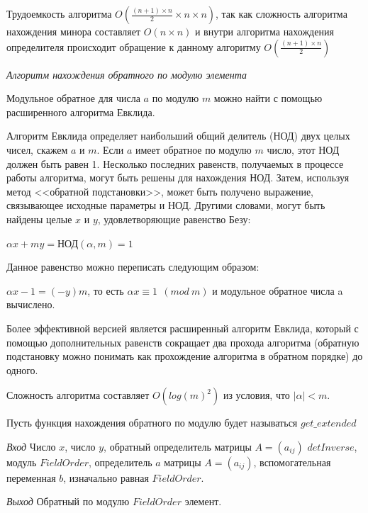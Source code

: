\documentclass[bachelor, och, labwork]{shiza}
\begin{document}
Трудоемкость алгоритма $O(\frac{(n + 1)\times n }{2} \times n \times n)$, так как сложность алгоритма нахождения 
минора составляет $O(n \times n)$ и внутри алгоритма нахождения определителя происходит
обращение к данному алгоритму $O(\frac{(n + 1)\times n}{2})$

\begin{center}
    \textit{Алгоритм нахождения обратного по модулю элемента}
\end{center}


Модульное обратное для числа $a$ по модулю $m$ можно найти с помощью расширенного 
алгоритма Евклида.

Алгоритм Евклида определяет наибольший общий делитель (НОД) двух целых чисел, скажем $a$ и $m$. 
Если $a$ имеет обратное по модулю $m$ число, этот НОД должен быть равен 1. Несколько 
последних равенств, получаемых в процессе работы алгоритма, могут быть решены для 
нахождения НОД. Затем, используя метод <<обратной подстановки>>, может быть получено 
выражение, связывающее исходные параметры и НОД. Другими словами, могут быть 
найдены целые $x$ и $y$, удовлетворяющие равенство Безу:
\begin{center}
    $\alpha x + my = \text{НОД}(\alpha, m) = 1$
\end{center}

Данное равенство можно переписать следующим образом:

\begin{center}
    $\alpha x - 1= (-y)m$, то есть $\alpha x \equiv 1 ~~(mod ~m )$ и модульное обратное числа a вычислено.
\end{center}

Более эффективной версией является расширенный алгоритм Евклида, который с помощью 
дополнительных равенств сокращает два прохода алгоритма (обратную подстановку можно 
понимать как прохождение алгоритма в обратном порядке) до одного.

Сложность алгоритма составляет $O(log(m)^2)$ из условия, что $| \alpha \vert < m$.

Пусть функция нахождения обратного по модулю будет называться $get\_extended$

\textit{Вход} Число $x$, число $y$, обратный определитель матрицы $A = (a_{ij})$ $detInverse$,
модуль $FieldOrder$, определитель $a$ матрицы $A = (a_{ij})$, вспомогательная переменная $b$, 
изначально равная $FieldOrder$.

\textit{Выход} Обратный по модулю $FieldOrder$ элемент.
\end{document}
